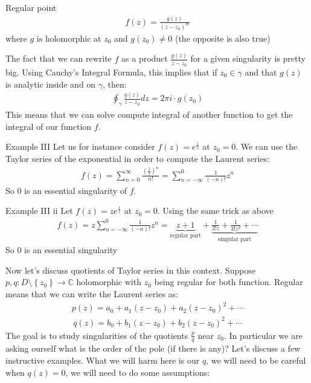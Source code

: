 \begin{parag}{Regular point}
	\begin{align*} f\left(z\right) = \frac{g\left(z\right)}{\left(z - z_0\right)^{m}} \end{align*}
	where $g$ is holomorphic at $z_0$ and $g\left(z_0\right)\neq 0$ (the opposite is also true)
	\begin{framedremark}
	The fact that we can rewrite $f$ as a product $\frac{g\left(z\right)}{z - z_0}$ for a given singularity is pretty big. Using Cauchy's Integral Formula, this implies that if $z_0 \in \gamma$ and that $g\left(z\right)$ is analytic inside and on $\gamma$, then:
	\begin{align*} 
		\oint_{\gamma}\frac{g\left(z\right)}{z - z_0}dz =  2\pi i \cdot  g\left(z_0\right) 
	\end{align*}
	This means that we can solve compute integral of another function to get the integral of our function $f$.
	\end{framedremark}
	\begin{subparag}{Example III}
	    Let us for instance consider $f\left(z\right) = e^{\frac{1}{z}}$ at $z_0 = 0$. We can use the Taylor series of the exponential in order to compute the Laurent series:
		\begin{align*} 
			f\left(z\right) = \sum_{n= 0}^{\infty}\frac{\left(\frac{1}{z}\right)^{n}}{n!} = \sum_{n= -\infty}^{0}\frac{1}{\left(-n\right)!}z^{n}
		\end{align*}
		So $0$ is an essential singularity of $f$.
	\end{subparag}
	\begin{subparag}{Example III ii}
	    Let $f\left(z\right) = ze^{\frac{1}{z}}$ at $z_0 = 0$. Using the same trick as above
		\begin{align*} 
			f\left(z\right) = z \sum_{n= -\infty}^{0}\frac{1}{\left(-n\right)!}z^{n} =  \underbrace{z + 1}_{\text{regular part}} + \underbrace{\frac{1}{2!z} + \frac{1}{3!z^2} + \cdots}_{\text{singular part}} 
		\end{align*}
			So $0$ is an essential singularity
	\end{subparag}
\end{parag}
Now let's discuss quotients of Taylor series in this context. Suppose $p, q : D \setminus \left\{z_0\right\} \to \mathbb{C}$ holomorphic with $z_0$ being regular for both function. Regular means that we can write the Laurent series as:
\begin{align*} 
	p\left(z\right) = a_0 + a_1 \left(z - z_0\right) + a_2\left(z - z_0\right)^2 + \cdots
\end{align*}
\begin{align*} 
	q\left(z\right) = b_0 + b_1 \left(z - z_0\right) + b_2\left(z - z_0\right)^2 + \cdots
\end{align*}
The goal is to study singularities of the quotients $\frac{p}{q}$ near $z_0$. In particular we are asking ourself what is the order of the pole (if there is any)? Let's discuss a few instructive examples. What we will harm here is our $q$, we will need to be careful when $q\left(z\right) = 0$, we will need to do some assumptions:

